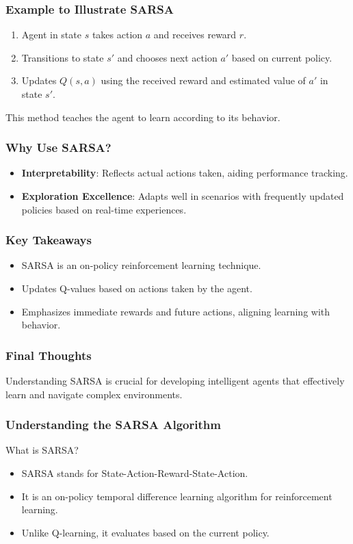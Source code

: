 \documentclass[aspectratio=169]{beamer}
\begin{document}
\begin{frame}[fragile]
    \frametitle{Example to Illustrate SARSA}
    \begin{enumerate}
        \item Agent in state \( s \) takes action \( a \) and receives reward \( r \).
        \item Transitions to state \( s' \) and chooses next action \( a' \) based on current policy.
        \item Updates \( Q(s, a) \) using the received reward and estimated value of \( a' \) in state \( s' \).
    \end{enumerate}
    This method teaches the agent to learn according to its behavior.
\end{frame}

\begin{frame}[fragile]
    \frametitle{Why Use SARSA?}
    \begin{itemize}
        \item \textbf{Interpretability}: Reflects actual actions taken, aiding performance tracking.
        \item \textbf{Exploration Excellence}: Adapts well in scenarios with frequently updated policies based on real-time experiences.
    \end{itemize}
\end{frame}

\begin{frame}[fragile]
    \frametitle{Key Takeaways}
    \begin{itemize}
        \item SARSA is an on-policy reinforcement learning technique.
        \item Updates Q-values based on actions taken by the agent.
        \item Emphasizes immediate rewards and future actions, aligning learning with behavior.
    \end{itemize}
\end{frame}

\begin{frame}[fragile]
    \frametitle{Final Thoughts}
    Understanding SARSA is crucial for developing intelligent agents that effectively learn and navigate complex environments.
\end{frame}

\begin{frame}[fragile]
    \frametitle{Understanding the SARSA Algorithm}
    \begin{block}{What is SARSA?}
        \begin{itemize}
            \item SARSA stands for State-Action-Reward-State-Action.
            \item It is an on-policy temporal difference learning algorithm for reinforcement learning.
            \item Unlike Q-learning, it evaluates based on the current policy.
        \end{itemize}
    \end{block}
\end{frame}
\end{document}
